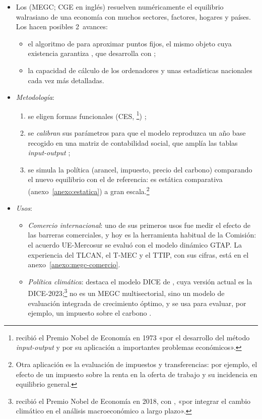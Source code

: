 \documentclass[11pt]{article}
\begin{document}
\begin{itemize}
\item Los  (MEGC; CGE en inglés) resuelven numéricamente el equilibrio walrasiano de una economía con muchos sectores, factores, hogares y países. Los hacen posibles 2~avances:
  \begin{itemize}
  \item el algoritmo de \textcite{Scarf1967Approximation} para aproximar puntos fijos, el mismo objeto cuya existencia garantiza , que desarrolla con \textcite{ScarfHansen1973Computation};
  \item la capacidad de cálculo de los ordenadores y unas estadísticas nacionales cada vez más detalladas.
  \end{itemize}
\item \emph{Metodología}\nocite{ShovenWhalley1992Applying}:
  \begin{enumerate}
  \item se eligen formas funcionales (CES, \footnote{ recibió el Premio Nobel de Economía en 1973 «por el desarrollo del método \emph{input-output} y por su aplicación a importantes problemas económicos»\nocite{Nobel1973Leontief}.}) ;
  \item se \emph{calibran} sus parámetros para que el modelo reproduzca un año base recogido en una matriz de contabilidad social, que amplía las tablas \emph{input-output} ;
  \item se simula la política (arancel, impuesto, precio del carbono) comparando el nuevo equilibrio con el de referencia: es estática comparativa (anexo~\ref{anexo:estatica}) a gran escala.\footnote{Otra aplicación es la evaluación de impuestos y transferencias: por ejemplo, el efecto de un impuesto sobre la renta en la oferta de trabajo y su incidencia en equilibrio general.}
  \end{enumerate}
\item \emph{Usos}:
  \begin{itemize}
  \item \emph{Comercio internacional}: uno de sus primeros usos fue medir el efecto de las barreras comerciales, y hoy es la herramienta habitual de la Comisión: el acuerdo UE-Mercosur se evaluó con el modelo dinámico GTAP. La experiencia del TLCAN, el T-MEC y el TTIP, con sus cifras, está en el anexo~\ref{anexo:megc-comercio}.
  \item \emph{Política climática}: destaca el modelo DICE de , cuya versión actual es la DICE-2023\nocite{BarrageNordhaus2024DICE};\footnote{ recibió el Premio Nobel de Economía en 2018, con , «por integrar el cambio climático en el análisis macroeconómico a largo plazo»\nocite{Nobel2018Nordhaus}.} no es un MEGC multisectorial, sino un modelo de evaluación integrada de crecimiento óptimo, y se usa para evaluar, por ejemplo, un impuesto sobre el carbono  .

\end{itemize}
\end{itemize}
\end{document}
